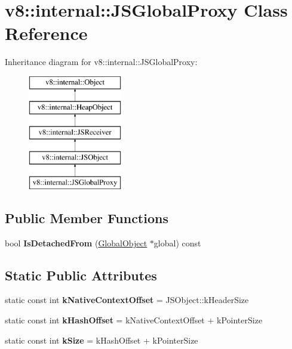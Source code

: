 \hypertarget{classv8_1_1internal_1_1_j_s_global_proxy}{}\section{v8\+:\+:internal\+:\+:J\+S\+Global\+Proxy Class Reference}
\label{classv8_1_1internal_1_1_j_s_global_proxy}
Inheritance diagram for v8\+:\+:internal\+:\+:J\+S\+Global\+Proxy\+:\begin{figure}[H]
\begin{center}
\leavevmode
\includegraphics[height=5.000000cm]{classv8_1_1internal_1_1_j_s_global_proxy}
\end{center}
\end{figure}
\subsection*{Public Member Functions}
\begin{DoxyCompactItemize}
\item 
\hypertarget{classv8_1_1internal_1_1_j_s_global_proxy_a67f54985d284db1b0ff35362affd5b64}{}bool {\bfseries Is\+Detached\+From} (\hyperlink{classv8_1_1internal_1_1_global_object}{Global\+Object} $\ast$global) const \label{classv8_1_1internal_1_1_j_s_global_proxy_a67f54985d284db1b0ff35362affd5b64}

\end{DoxyCompactItemize}
\subsection*{Static Public Attributes}
\begin{DoxyCompactItemize}
\item 
\hypertarget{classv8_1_1internal_1_1_j_s_global_proxy_a8636791b0b48721886318cbda1674872}{}static const int {\bfseries k\+Native\+Context\+Offset} = J\+S\+Object\+::k\+Header\+Size\label{classv8_1_1internal_1_1_j_s_global_proxy_a8636791b0b48721886318cbda1674872}

\item 
\hypertarget{classv8_1_1internal_1_1_j_s_global_proxy_a7ee9d52ce8e294b286fd3172a91d0b33}{}static const int {\bfseries k\+Hash\+Offset} = k\+Native\+Context\+Offset + k\+Pointer\+Size\label{classv8_1_1internal_1_1_j_s_global_proxy_a7ee9d52ce8e294b286fd3172a91d0b33}

\item 
\hypertarget{classv8_1_1internal_1_1_j_s_global_proxy_a27f9783972c70443622c9869d720f5f5}{}static const int {\bfseries k\+Size} = k\+Hash\+Offset + k\+Pointer\+Size\label{classv8_1_1internal_1_1_j_s_global_proxy_a27f9783972c70443622c9869d720f5f5}

\end{DoxyCompactItemize}
